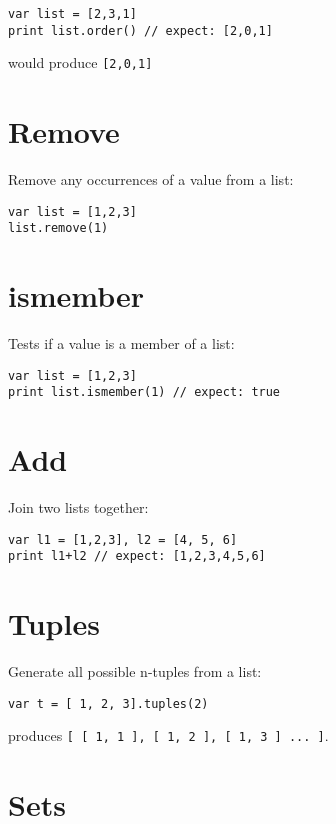 \begin{lstlisting}
var list = [2,3,1]
print list.order() // expect: [2,0,1]
\end{lstlisting}

would produce \texttt{{[}2,0,1{]}}

\hypertarget{remove}{%
\section{Remove}\label{remove}}

Remove any occurrences of a value from a list:

\begin{lstlisting}
var list = [1,2,3]
list.remove(1)
\end{lstlisting}

\hypertarget{ismember}{%
\section{ismember}\label{ismember}}

Tests if a value is a member of a list:

\begin{lstlisting}
var list = [1,2,3]
print list.ismember(1) // expect: true
\end{lstlisting}

\hypertarget{add}{%
\section{Add}\label{add}}

Join two lists together:

\begin{lstlisting}
var l1 = [1,2,3], l2 = [4, 5, 6]
print l1+l2 // expect: [1,2,3,4,5,6]
\end{lstlisting}

\hypertarget{tuples}{%
\section{Tuples}\label{tuples}}

Generate all possible n-tuples from a list:

\begin{lstlisting}
var t = [ 1, 2, 3].tuples(2)
\end{lstlisting}

produces
\texttt{{[}\ {[}\ 1,\ 1\ {]},\ {[}\ 1,\ 2\ {]},\ {[}\ 1,\ 3\ {]}\ ...\ {]}}.

\hypertarget{sets}{%
\section{Sets}\label{sets}}


